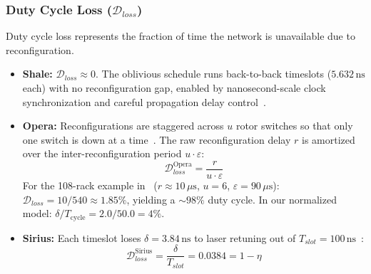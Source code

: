\documentclass{article}
\begin{document}
    \subsubsection{Duty Cycle Loss ($\mathcal{D}_{loss}$)}
    Duty cycle loss represents the fraction of time the network is unavailable due to reconfiguration.
    \begin{itemize}
        \item \textbf{Shale:} $\mathcal{D}_{loss} \approx 0$. The oblivious schedule runs back-to-back timeslots ($5.632\,\text{ns}$ each) with no reconfiguration gap, enabled by nanosecond-scale clock synchronization and careful propagation delay control~\cite{shale}.
        \item \textbf{Opera:} Reconfigurations are staggered across $u$ rotor switches so that only one switch is down at a time~\cite{opera}. The raw reconfiguration delay $r$ is amortized over the inter-reconfiguration period $u \cdot \varepsilon$:
        \[
            \mathcal{D}_{loss}^{\text{Opera}} = \frac{r}{u \cdot \varepsilon}
        \]
        For the 108-rack example in~\cite{opera} ($r \approx 10\,\mu\text{s}$, $u = 6$, $\varepsilon = 90\,\mu\text{s}$): $\mathcal{D}_{loss} = 10/540 \approx 1.85\%$, yielding a ${\sim}98\%$ duty cycle. In our normalized model: $\delta / T_{\text{cycle}} = 2.0/50.0 = 4\%$.
        \item \textbf{Sirius:} Each timeslot loses $\delta = 3.84\,\text{ns}$ to laser retuning out of $T_{slot} = 100\,\text{ns}$~\cite{sirius}:
        \[
            \mathcal{D}_{loss}^{\text{Sirius}} = \frac{\delta}{T_{slot}} = 0.0384 = 1 - \eta
        \]
    \end{itemize}
\end{document}
